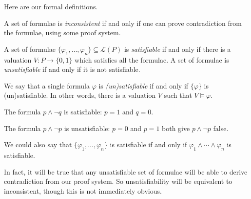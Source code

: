 \documentclass[../notes.tex]{subfiles}
\begin{document}
Here are our formal definitions.
\begin{definition}[Inconsistent]
	A set of formulae is \textit{inconsistent} if and only if one can prove contradiction from the formulae, using some proof system.
\end{definition}
\begin{definition}[Satisfiable]
	A set of formulae $\{\varphi_1,\ldots,\varphi_n\}\subseteq\mathcal L(P)$ is \textit{satisfiable} if and only if there is a valuation $V:P\to\{0,1\}$ which satisfies all the formulae. A set of formulae is \textit{unsatisfiable} if and only if it is not satisfiable.

	We say that a single formula $\varphi$ is \textit{(un)satisfiable} if and only if $\{\varphi\}$ is (un)satisfiable. In other words, there is a valuation $V$ such that $V\models\varphi$.
\end{definition}
\begin{example}
	The formula $p\land\lnot q$ is satisfiable: $p=1$ and $q=0$.
\end{example}
\begin{example}
	The formula $p\land\lnot p$ is unsatisfiable: $p=0$ and $p=1$ both give $p\land\lnot p$ false.
\end{example}
We could also say that $\{\varphi_1,\ldots,\varphi_n\}$ is satisfiable if and only if $\varphi_1\land\cdots\land\varphi_n$ is satisfiable.
\begin{remark}
	In fact, it will be true that any unsatisfiable set of formulae will be able to derive contradiction from our proof system. So unsatisfiability will be equivalent to inconsistent, though this is not immediately obvious.
\end{remark}
\end{document}
